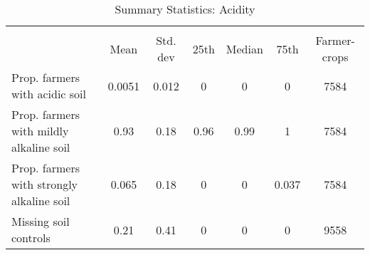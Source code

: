 \begin{table}[htbp]\centering
\def\sym#1{\ifmmode^{#1}\else\(^{#1}\)\fi}
\caption{Summary Statistics: Acidity\label{tab:sumstats}}
\begin{tabular}{l*{1}{cccccc}}
\toprule
                    &\multicolumn{6}{c}{}                                                         \\
                    &        Mean&    Std. dev&        25th&      Median&        75th&Farmer-crops\\
\midrule
Prop. farmers with acidic soil&      0.0051&       0.012&           0&           0&           0&        7584\\
Prop. farmers with mildly alkaline soil&        0.93&        0.18&        0.96&        0.99&           1&        7584\\
Prop. farmers with strongly alkaline soil&       0.065&        0.18&           0&           0&       0.037&        7584\\
Missing soil controls&        0.21&        0.41&           0&           0&           0&        9558\\
\bottomrule
\end{tabular}
\end{table}
